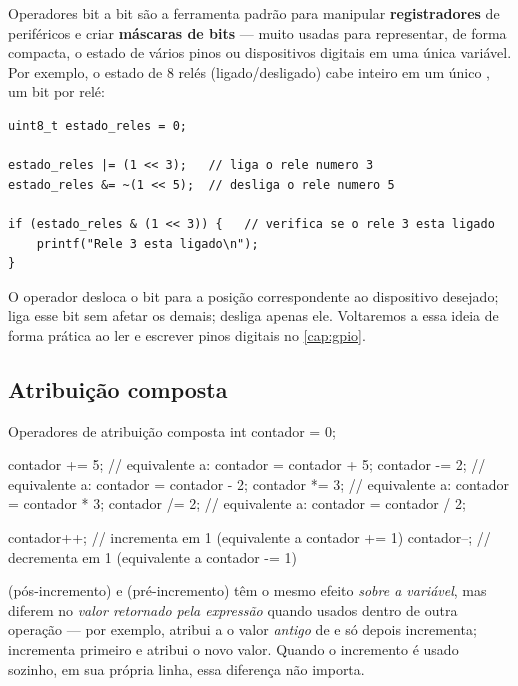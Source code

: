 \begin{esp32box}
Operadores bit a bit são a ferramenta padrão para manipular \textbf{registradores} de periféricos e criar \textbf{máscaras de bits} — muito usadas para representar, de forma compacta, o estado de vários pinos ou dispositivos digitais em uma única variável. Por exemplo, o estado de 8 relés (ligado/desligado) cabe inteiro em um único , um bit por relé:
\begin{verbatim}
uint8_t estado_reles = 0;

estado_reles |= (1 << 3);   // liga o rele numero 3
estado_reles &= ~(1 << 5);  // desliga o rele numero 5

if (estado_reles & (1 << 3)) {   // verifica se o rele 3 esta ligado
    printf("Rele 3 esta ligado\n");
}
\end{verbatim}
O operador \code{<<} desloca o bit  para a posição correspondente ao dispositivo desejado; \code{|=} liga esse bit sem afetar os demais;  desliga apenas ele. Voltaremos a essa ideia de forma prática ao ler e escrever pinos digitais no \cref{cap:gpio}.
\end{esp32box}

\subsection{Atribuição composta}

\begin{codigoc}{Operadores de atribuição composta}
int contador = 0;

contador += 5;   // equivalente a: contador = contador + 5;
contador -= 2;   // equivalente a: contador = contador - 2;
contador *= 3;   // equivalente a: contador = contador * 3;
contador /= 2;   // equivalente a: contador = contador / 2;

contador++;      // incrementa em 1 (equivalente a contador += 1)
contador--;      // decrementa em 1 (equivalente a contador -= 1)
\end{codigoc}

\begin{dica}
 (pós-incremento) e  (pré-incremento) têm o mesmo efeito \emph{sobre a variável}, mas diferem no \emph{valor retornado pela expressão} quando usados dentro de outra operação — por exemplo,  atribui a  o valor \emph{antigo} de  e só depois incrementa;  incrementa primeiro e atribui o novo valor. Quando o incremento é usado sozinho, em sua própria linha, essa diferença não importa.
\end{dica}


